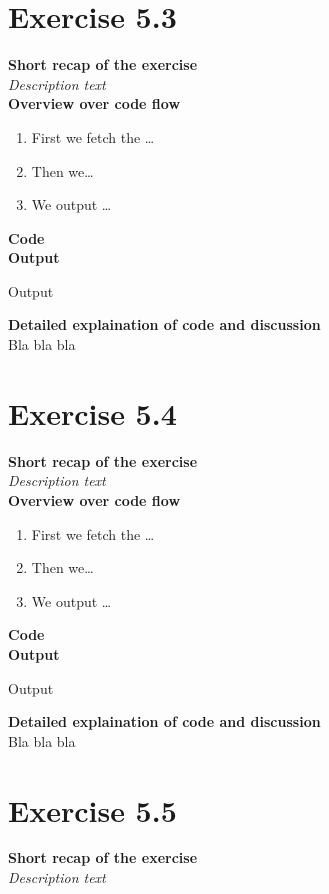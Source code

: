 \documentclass{article}
\newcommand\pythonstyle{\lstset{
language=python,
breaklines=true,
basicstyle=\ttfamily\small,
otherkeywords={1, 2, 3, 4, 5, 6, 7, 8 ,9 , 0, -, =, +, [, ], (, ), \{, \}, :, *, !},             %
keywordstyle=\color{blue},
emph={class, pass, in, for, while, if, is, elif, else, not, and, or, OR
    def, print, exec, break, continue, return},
emphstyle=\color{black}\bfseries,
emph={[2]True, False, None, self},
emphstyle=[2]\color{purple},
emph={[3]from, import, as},
emphstyle=[3]\color{blue},
stringstyle=\color{red},
frame=tb,
showstringspaces=false,
morecomment=[s]{"""}{"""},
commentstyle=\color{gray},
rulesepcolor=\color{blue},
title=\lstname
}}
\newcommand\pythonexternal[2][]{{
\pythonstyle
}}
\begin{document}
\section{Exercise 5.3}
\textbf{Short recap of the exercise}\\
\textit{Description text}\\

\textbf{Overview over code flow}\\

\begin{enumerate}
  \item First we fetch the \ldots
  \item Then we\ldots
  \item We output \ldots\\
\end{enumerate}

\textbf{Code}\\
\textbf{Output}
\begin{pythonOutput}
Output
\end{pythonOutput}
\textbf{Detailed explaination of code and discussion}\\
Bla bla bla
\section{Exercise 5.4}
\textbf{Short recap of the exercise}\\
\textit{Description text}\\

\textbf{Overview over code flow}\\

\begin{enumerate}
  \item First we fetch the \ldots
  \item Then we\ldots
  \item We output \ldots\\
\end{enumerate}

\textbf{Code}\\
\textbf{Output}
\begin{pythonOutput}
Output
\end{pythonOutput}
\textbf{Detailed explaination of code and discussion}\\
Bla bla bla
\section{Exercise 5.5}
\textbf{Short recap of the exercise}\\
\textit{Description text}\\
\end{document}
